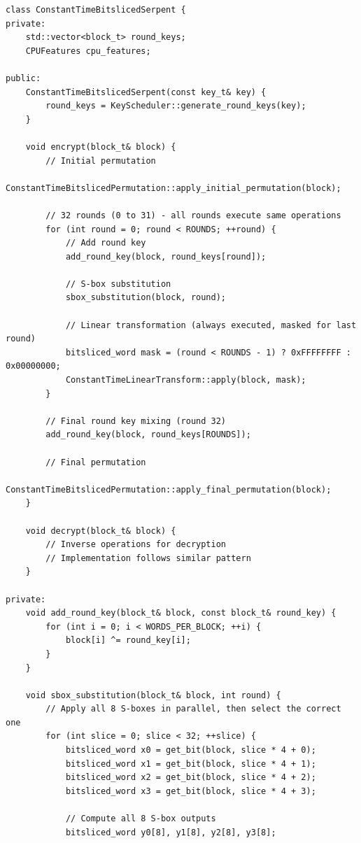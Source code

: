 \documentclass[12pt,a4paper]{article}
\begin{document}
\begin{lstlisting}[caption=Constant-Time Bitsliced Serpent Cipher]
class ConstantTimeBitslicedSerpent {
private:
    std::vector<block_t> round_keys;
    CPUFeatures cpu_features;

public:
    ConstantTimeBitslicedSerpent(const key_t& key) {
        round_keys = KeyScheduler::generate_round_keys(key);
    }

    void encrypt(block_t& block) {
        // Initial permutation
        ConstantTimeBitslicedPermutation::apply_initial_permutation(block);
        
        // 32 rounds (0 to 31) - all rounds execute same operations
        for (int round = 0; round < ROUNDS; ++round) {
            // Add round key
            add_round_key(block, round_keys[round]);
            
            // S-box substitution
            sbox_substitution(block, round);
            
            // Linear transformation (always executed, masked for last round)
            bitsliced_word mask = (round < ROUNDS - 1) ? 0xFFFFFFFF : 0x00000000;
            ConstantTimeLinearTransform::apply(block, mask);
        }
        
        // Final round key mixing (round 32)
        add_round_key(block, round_keys[ROUNDS]);
        
        // Final permutation
        ConstantTimeBitslicedPermutation::apply_final_permutation(block);
    }

    void decrypt(block_t& block) {
        // Inverse operations for decryption
        // Implementation follows similar pattern
    }

private:
    void add_round_key(block_t& block, const block_t& round_key) {
        for (int i = 0; i < WORDS_PER_BLOCK; ++i) {
            block[i] ^= round_key[i];
        }
    }

    void sbox_substitution(block_t& block, int round) {
        // Apply all 8 S-boxes in parallel, then select the correct one
        for (int slice = 0; slice < 32; ++slice) {
            bitsliced_word x0 = get_bit(block, slice * 4 + 0);
            bitsliced_word x1 = get_bit(block, slice * 4 + 1);
            bitsliced_word x2 = get_bit(block, slice * 4 + 2);
            bitsliced_word x3 = get_bit(block, slice * 4 + 3);
            
            // Compute all 8 S-box outputs
            bitsliced_word y0[8], y1[8], y2[8], y3[8];
            

\end{lstlisting}
\end{document}
